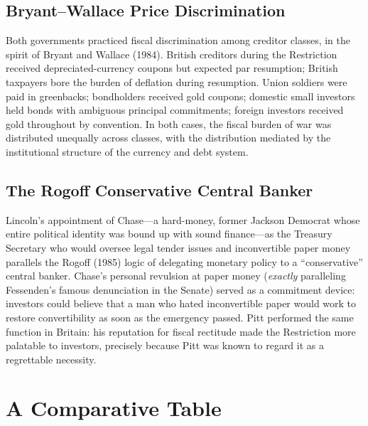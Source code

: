 \documentclass[12pt]{article}
\begin{document}
\subsection{Bryant--Wallace Price Discrimination}

Both governments practiced fiscal discrimination among creditor classes,
in the spirit of Bryant and Wallace (1984). British creditors during the
Restriction received depreciated-currency coupons but expected par
resumption; British taxpayers bore the burden of deflation during
resumption. Union soldiers were paid in greenbacks; bondholders received
gold coupons; domestic small investors held bonds with ambiguous principal
commitments; foreign investors received gold throughout by convention.
In both cases, the fiscal burden of war was distributed unequally across
classes, with the distribution mediated by the institutional structure
of the currency and debt system.

\subsection{The Rogoff Conservative Central Banker}

Lincoln's appointment of Chase---a hard-money, former Jackson Democrat
whose entire political identity was bound up with sound finance---as
the Treasury Secretary who would oversee legal tender issues and
inconvertible paper money parallels the Rogoff (1985) logic of
delegating monetary policy to a ``conservative'' central banker. Chase's
personal revulsion at paper money (\textit{exactly} paralleling
Fessenden's famous denunciation in the Senate) served as a commitment
device: investors could believe that a man who hated inconvertible paper
would work to restore convertibility as soon as the emergency passed.
Pitt performed the same function in Britain: his reputation for fiscal
rectitude made the Restriction more palatable to investors, precisely
because Pitt was known to regard it as a regrettable necessity.

\section{A Comparative Table}
\end{document}
